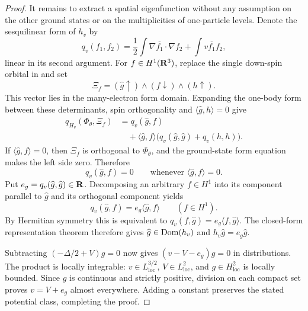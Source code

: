 \begin{proof}
It remains to extract a spatial eigenfunction without any assumption
on the other ground states or on the multiplicities of one-particle
levels.  Denote the sesquilinear form of $h_v$ by
\[
 q_v(f_1,f_2)
 =\frac12\int\nabla\overline{f_1}\cdot\nabla f_2
       +\int v\overline{f_1}f_2,
\]
linear in its second argument.  For $f\in H^1(\mathbf R^3)$, replace the single down-spin orbital
in  and set
\[
 \Xi_f=(\widehat g\uparrow)\wedge(f\downarrow)\wedge(h\uparrow).
\]
This vector lies in the many-electron form domain.  Expanding the
one-body form between these determinants, spin orthogonality and
$\langle\widehat g,h\rangle=0$ give
\[
 \begin{aligned}
 q_{H_v}(\Phi_\theta,\Xi_f)
 &=q_v(\widehat g,f)\\
 &\quad+\langle\widehat g,f\rangle
       \bigl(q_v(\widehat g,\widehat g)+q_v(h,h)\bigr).
 \end{aligned}
\]
If $\langle\widehat g,f\rangle=0$, then $\Xi_f$ is orthogonal to
$\Phi_\theta$, and the ground-state form equation makes the left side
zero.  Therefore
\[
 q_v(\widehat g,f)=0
 \qquad\text{whenever }\langle\widehat g,f\rangle=0.
\]
Put $e_g=q_v(\widehat g,\widehat g)\in\mathbf R$.  Decomposing an arbitrary
$f\in H^1$ into its component parallel to $\widehat g$ and its
orthogonal component yields
\[
 q_v(\widehat g,f)=e_g\langle\widehat g,f\rangle
 \qquad(f\in H^1).
\]
By Hermitian symmetry this is equivalent to
\(q_v(f,\widehat g)=e_g\langle f,\widehat g\rangle\).
The closed-form representation theorem
\cite[Chapter~VI, Theorem~2.1\textup{(iii)}]{Kato} therefore gives
$\widehat g\in\operatorname{Dom}(h_v)$ and $h_v\widehat g=e_g\widehat g$.

Subtracting $(-\Delta/2+V)g=0$ now gives
$(v-V-e_g)g=0$ in distributions.  The product is locally integrable:
$v\in L^{3/2}_{\mathrm{loc}}$, $V\in L^2_{\mathrm{loc}}$, and
$g\in H^2_{\mathrm{loc}}$ is locally bounded.  Since $g$ is continuous
and strictly positive, division on each compact set proves
$v=V+e_g$ almost everywhere.  Adding a constant preserves the stated
potential class, completing the proof.
\end{proof}

